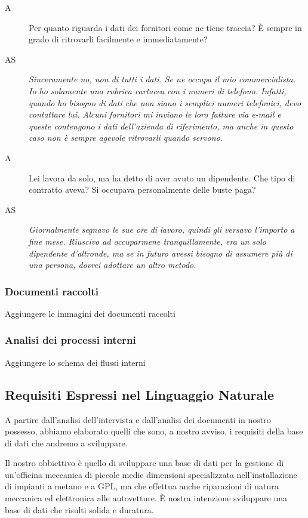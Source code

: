\begin{description}
 			\item[A]
 				Per quanto riguarda i dati dei fornitori come ne tiene traccia? È sempre in grado di ritrovarli facilmente e immediatamente?
 			\item[AS]
 				\emph{Sinceramente no, non di tutti i dati. Se ne occupa il mio commercialista. Io ho solamente una rubrica cartacea con i numeri di telefono. Infatti, quando ho bisogno di dati che non siano i semplici numeri telefonici, devo contattare lui. Alcuni fornitori mi inviano le loro fatture via e-mail e queste contengono i dati dell'azienda di riferimento, ma anche in questo caso non è sempre agevole ritrovarli quando servono.}
 			\item[A]
 				Lei lavora da solo, ma ha detto di aver avuto un dipendente. Che tipo di contratto aveva? Si occupava personalmente delle buste paga?
 			\item[AS]
 				\emph{Giornalmente segnavo le sue ore di lavoro, quindi gli versavo l'importo a fine mese. Riuscivo ad occuparmene tranquillamente, era un solo dipendente d'altronde, ma se in futuro avessi bisogno di assumere più di una persona, dovrei adottare un altro metodo.}
		\end{description}
				
		\subsubsection{Documenti raccolti}
			Aggiungere le immagini dei documenti raccolti
		\subsubsection{Analisi dei processi interni}
			Aggiungere lo schema dei flussi interni
		
	\subsection{Requisiti Espressi nel Linguaggio Naturale}
	
		A partire dall’analisi dell’intervista e dall’analisi dei documenti in nostro possesso, abbiamo elaborato quelli che sono, a nostro avviso, i requisiti della base di dati che andremo a sviluppare. 
		
		Il nostro obbiettivo è quello di sviluppare una base di dati per la gestione di un’officina meccanica di piccole medie dimensioni specializzata nell’installazione di impianti a metano e a GPL, ma che effettua anche riparazioni di natura meccanica ed elettronica alle autovetture. È nostra intenzione sviluppare una base di dati che risulti solida e duratura.
		
